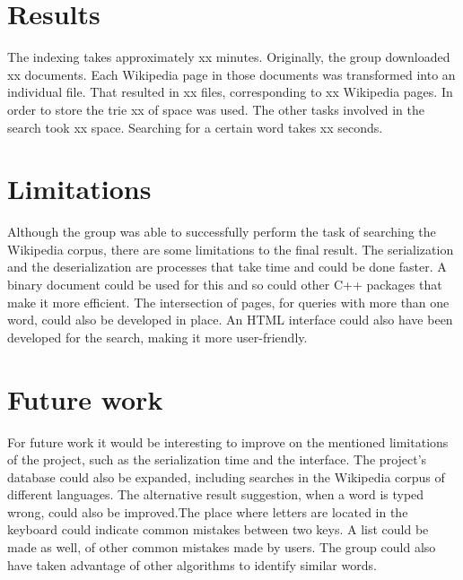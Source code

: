 \documentclass{article}
\begin{document}
\section*{Results}
The indexing takes approximately xx minutes. Originally, the group downloaded xx documents. Each Wikipedia page in those documents was transformed into an individual file. That resulted in xx files, corresponding to xx Wikipedia pages. In order to store the trie xx of space was used. The other tasks involved in the search took xx space. Searching for a certain word takes xx seconds. 

\section*{Limitations}
Although the group was able to successfully perform the task of searching the Wikipedia corpus, there are some limitations to the final result. The serialization and the deserialization are processes that take time and could be done faster. A binary document could be used for this and so could other C++ packages that make it more efficient. The intersection of pages, for queries with more than one word, could also be developed in place. An HTML interface could also have been developed for the search, making it more user-friendly.


\section*{Future work}
For future work it would be interesting to improve on the mentioned limitations of the project, such as the serialization time and the interface. The project's database could also be expanded, including searches in the Wikipedia corpus of different languages. The alternative result suggestion, when a word is typed wrong, could also be improved.The place where letters are located in the keyboard could indicate common mistakes between two keys. A list could be made as well, of other common mistakes made by users. The group could also have taken advantage of other algorithms to identify similar words. 
\end{document}
